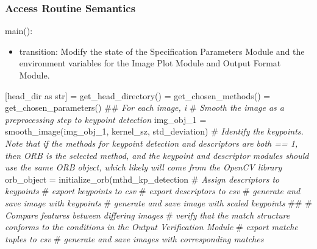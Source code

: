 \documentclass[12pt, titlepage]{article}
\begin{document}

\subsubsection{Access Routine Semantics}
\noindent main():
\begin{itemize}
\item transition: Modify the state of the Specification Parameters Module and the 
environment variables for the Image Plot Module and Output Format Module.
\end{itemize}
[head\_dir as str] = get\_head\_directory() \newline {} 
= get\_chosen\_methods() \newline {} 
= get\_chosen\_parameters() \newline \newline
\#\# \textit{For each image, i}\newline
\# \textit{Smooth the image as a preprocessing step to keypoint detection} \newline
img\_obj\_1 = smooth\_image(img\_obj\_1, kernel\_sz, std\_deviation) \newline \newline
\# \textit{Identify the keypoints. Note that if the methods for keypoint detection and 
descriptors are both == 1, then ORB is the selected method, and the keypoint and descriptor 
modules should use the same ORB object, which likely will come from the OpenCV library}\newline
orb\_object = initialize\_orb(mthd\_kp\_detection\newline 
\# \textit{Assign descriptors to keypoints} \newline \newline
\# \textit{export keypoints to csv} \newline 
\# \textit{export descriptors to csv} \newline\newline
\# \textit{generate and save image with keypoints} \newline 
\# \textit{generate and save image with scaled keypoints} \newline
\#\# \newline \newline
\# \textit{Compare features between differing images} \newline \newline
\# \textit{verify that the match structure conforms to the conditions in the
Output Verification Module} \newline \newline 
\# \textit{export matche tuples to csv} \newline 
\# \textit{generate and save images with corresponding matches} \newline
\end{document}
